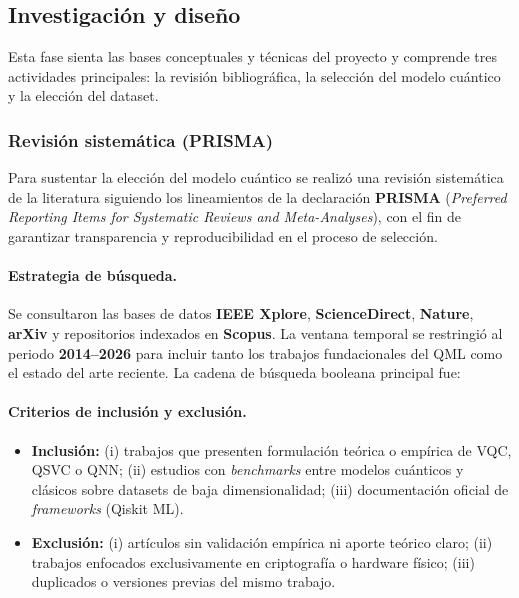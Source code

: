 \documentclass[a4paper,10pt,twocolumn]{article}
\begin{document}
\subsection{Investigaci\'on y dise\~no}

Esta fase sienta las bases conceptuales y t\'ecnicas del proyecto y
comprende tres actividades principales: la revisi\'on bibliogr\'afica,
la selecci\'on del modelo cu\'antico y la elecci\'on del dataset.

\subsubsection{Revisi\'on sistem\'atica (PRISMA)}

Para sustentar la elecci\'on del modelo cu\'antico se realiz\'o una
revisi\'on sistem\'atica de la literatura siguiendo los lineamientos de
la declaraci\'on \textbf{PRISMA} (\textit{Preferred Reporting Items for
Systematic Reviews and Meta-Analyses}), con el fin de garantizar
transparencia y reproducibilidad en el proceso de selecci\'on.

\paragraph{Estrategia de b\'usqueda.}
Se consultaron las bases de datos \textbf{IEEE Xplore},
\textbf{ScienceDirect}, \textbf{Nature}, \textbf{arXiv} y repositorios
indexados en \textbf{Scopus}. La ventana temporal se restringi\'o al
periodo \textbf{2014--2026} para incluir tanto los trabajos
fundacionales del QML como el estado del arte reciente. La cadena de
b\'usqueda booleana principal fue:
\begin{center}\footnotesize
{}
\end{center}

\paragraph{Criterios de inclusi\'on y exclusi\'on.}
\begin{itemize}
    \item \textbf{Inclusi\'on:} (i) trabajos que presenten formulaci\'on
    te\'orica o emp\'irica de VQC, QSVC o QNN; (ii) estudios con
    \textit{benchmarks} entre modelos cu\'anticos y cl\'asicos sobre
    datasets de baja dimensionalidad; (iii) documentaci\'on oficial de
    \textit{frameworks} (Qiskit ML).
    \item \textbf{Exclusi\'on:} (i) art\'iculos sin validaci\'on
    emp\'irica ni aporte te\'orico claro; (ii) trabajos enfocados
    exclusivamente en criptograf\'ia o hardware f\'isico; (iii)
    duplicados o versiones previas del mismo trabajo.
\end{itemize}
\end{document}
